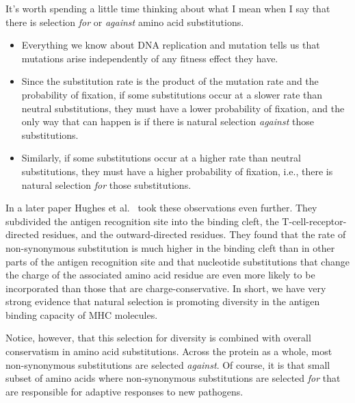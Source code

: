 \noindent It's worth spending a little time thinking about what I mean
when I say that there is selection {\it for\/} or {\it against\/}
amino acid substitutions.

\begin{itemize}

\item Everything we know about DNA replication and mutation tells us
  that mutations arise independently of any fitness effect they
  have.

\item Since the substitution rate is the product of the mutation rate
  and the probability of fixation, if some substitutions occur at a
  slower rate than neutral substitutions, they must have a lower
  probability of fixation, and the only way that can happen is if
  there is natural selection {\it against\/} those substitutions.

\item Similarly, if some substitutions occur at a higher rate than
  neutral substitutions, they must have a higher probability of
  fixation, i.e., there is natural selection {\it for\/} those
  substitutions. 

\end{itemize}

In a later paper Hughes et al.~\cite{Hughes-etal90} took these
observations even further. They subdivided the antigen recognition
site into the binding cleft, the T-cell-receptor-directed residues,
and the outward-directed residues. They found that the rate of
non-synonymous substitution is much higher in the binding cleft than
in other parts of the antigen recognition site and that nucleotide 
substitutions that change the charge of the associated amino acid
residue are even more likely to be incorporated than those that are
charge-conservative. In short, we have very strong evidence that
natural selection is promoting diversity in the antigen binding
capacity of MHC molecules.

Notice, however, that this selection for diversity is combined with
overall conservatism in amino acid substitutions. Across the protein
as a whole, most non-synonymous substitutions are selected {\it
against}. Of course, it is that small subset of amino acids where
non-synonymous substitutions are selected {\it for} that are
responsible for adaptive responses to new pathogens.

